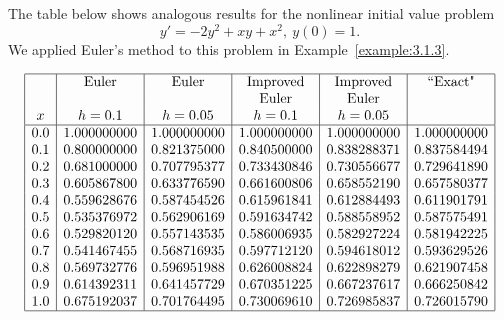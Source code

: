 \documentclass{ximera}
\begin{document}
\begin{example}\label{example:3.2.3}
The table below shows analogous results for the nonlinear
initial value problem
$$
y'=-2y^2+xy+x^2,\ y(0)=1.
$$
We applied Euler's  method to this problem in
Example~\ref{example:3.1.3}.


\[
\begin{array}{|c|c|c|c|c|c|}
\hline
 &\text{Euler} &\text{Euler} &\text{Improved} &\text{Improved}& \text{``Exact"}\\
 & & &\text{Euler}&\text{Euler}& \\
x&h=0.1&h=0.05&h=0.1&h=0.05&
\\ \hline
0.0 & 1.000000000 & 1.000000000 &1.000000000 & 1.000000000 & 1.000000000 \\
0.1 & 0.800000000 & 0.821375000 &0.840500000 & 0.838288371 & 0.837584494 \\
0.2 & 0.681000000 & 0.707795377 &0.733430846 & 0.730556677 & 0.729641890 \\
0.3 & 0.605867800 & 0.633776590 &0.661600806 & 0.658552190 & 0.657580377 \\
0.4 & 0.559628676 & 0.587454526 &0.615961841 & 0.612884493 & 0.611901791 \\
0.5 & 0.535376972 & 0.562906169 &0.591634742 & 0.588558952 & 0.587575491 \\
0.6 & 0.529820120 & 0.557143535 &0.586006935 & 0.582927224 & 0.581942225 \\
0.7 & 0.541467455 & 0.568716935 &0.597712120 & 0.594618012 & 0.593629526 \\
0.8 & 0.569732776 & 0.596951988 &0.626008824 & 0.622898279 & 0.621907458 \\
0.9 & 0.614392311 & 0.641457729 &0.670351225 & 0.667237617 & 0.666250842 \\
1.0 & 0.675192037 & 0.701764495 &0.730069610 & 0.726985837 & 0.726015790\\
\hline
\end{array}
\]
\end{example}
\end{document}
